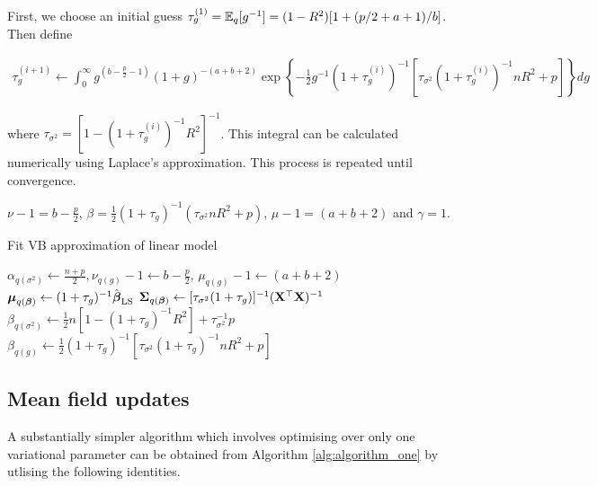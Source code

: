 \documentclass{amsart}[12pt]
\begin{document}
First, we choose an initial guess $\tau_g^{(1)} = \mathbb{E}_q [g^{-1}] = (1 - R^2) [1 + (p / 2 + a + 1)/b]$. Then
define

\begin{align*}
	\tau_g^{(i+1)} \leftarrow \int_0^\infty g^{\left(b - \frac{p}{2} - 1\right)}                                   
	(1 + g)^{- (a + b + 2)}                                                                                        
	\exp \left \{- \frac{1}{2} g^{-1}  (1 + \tau_g^{(i)})^{-1} [\tau_{\sigma^2} (1 + \tau_g^{(i)})^{-1} n R^2 + p] 
	\right \} dg                                                                                                   
\end{align*}

\noindent where $\tau_{\sigma^2} = [1 - (1 + \tau_g^{(i)})^{-1} R^2]^{-1}$. This integral can be calculated
numerically using Laplace's approximation. This process is repeated until convergence.

$\nu - 1 = b - \frac{p}{2}$, 
$\beta = \frac{1}{2} (1 + \tau_g)^{-1} (\tau_{\sigma^2} n R^2 + p)$, 
$\mu - 1 = (a + b + 2)$ and $\gamma = 1$. 

\begin{algorithm}
	\caption{Fit VB approximation of linear model}
	\label{alg:algorithm_one}
	\begin{algorithmic}
		\REQUIRE $\alpha_{q(\sigma^2)} \leftarrow \frac{n + p}{2}, \nu_{q(g)} - 1 \leftarrow b - \frac{p}{2}$, $\mu_{q(g)} - 1 \leftarrow (a + b + 2)$
		\STATE ${\boldsymbol \mu}_{q({\boldsymbol \beta})} \leftarrow (1 + \tau_g)^{-1} \hat{{\boldsymbol \beta}}_{\text{LS}}$
		\STATE ${\boldsymbol \Sigma}_{q({\boldsymbol \beta})} \leftarrow [\tau_{\sigma^2} (1 + \tau_g)]^{-1} ({\bf X}^\top {\bf X})^{-1}$
		\STATE $\beta_{q(\sigma^2)} \leftarrow  \frac{1}{2} {n[1 - (1 + \tau_g)^{-1} R^2] + \tau_{\sigma^2}^{-1} p}$
		\STATE $\beta_{q(g)} \leftarrow \frac{1}{2} (1 + \tau_g)^{-1} [\tau_{\sigma^2} (1 + \tau_g)^{-1} n R^2 + p]$
		\ENDWHILE
	\end{algorithmic}
\end{algorithm}

\subsection{Mean field updates}
\label{sec:mean_field_updates}

A substantially simpler algorithm  which involves optimising over only one variational parameter can be
obtained from Algorithm \ref{alg:algorithm_one} by utlising the following identities.
\end{document}
